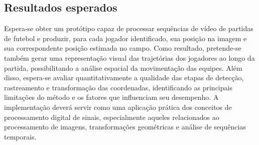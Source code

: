 \subsection{Resultados esperados} 
Espera-se obter um protótipo capaz de processar sequências de vídeo de partidas de futebol e produzir, para cada jogador 
identificado, sua posição na imagem e sua correspondente posição estimada no campo. Como resultado, pretende-se também 
gerar uma representação visual das trajetórias dos jogadores ao longo da partida, possibilitando a análise espacial da 
movimentação das equipes. Além disso, espera-se avaliar quantitativamente a qualidade das etapas de detecção, rastreamento e 
transformação das coordenadas, identificando as principais limitações do método e os fatores que influenciam seu desempenho. 
A implementação deverá servir como uma aplicação prática dos conceitos de processamento digital de sinais, especialmente 
aqueles relacionados ao processamento de imagens, transformações geométricas e análise de sequências temporais.